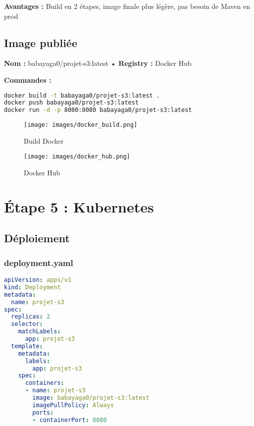 \documentclass[11pt,a4paper]{article}
\begin{document}
\textbf{Avantages :} Build en 2 étapes, image finale plus légère, pas besoin de Maven en prod

\subsection{Image publiée}
\begin{tcolorbox}[colback=blue!5!white,colframe=blue!75!black]
    \textbf{Nom :} babayaga0/projet-s3:latest • \textbf{Registry :} Docker Hub
\end{tcolorbox}

\textbf{Commandes :}
\begin{lstlisting}[language=bash]
docker build -t babayaga0/projet-s3:latest .
docker push babayaga0/projet-s3:latest
docker run -d -p 8080:8080 babayaga0/projet-s3:latest
\end{lstlisting}

\begin{figure}[H]
    \centering
    \texttt{[image: images/docker\_build.png]}
    \caption{Build Docker}
\end{figure}

\begin{figure}[H]
    \centering
    \texttt{[image: images/docker\_hub.png]}
    \caption{Docker Hub}
\end{figure}

\newpage

\section{Étape 5 : Kubernetes}

\subsection{Déploiement}

\subsubsection{deployment.yaml}
\begin{lstlisting}[language=yaml]
apiVersion: apps/v1
kind: Deployment
metadata:
  name: projet-s3
spec:
  replicas: 2
  selector:
    matchLabels:
      app: projet-s3
  template:
    metadata:
      labels:
        app: projet-s3
    spec:
      containers:
      - name: projet-s3
        image: babayaga0/projet-s3:latest
        imagePullPolicy: Always
        ports:
        - containerPort: 8080
\end{lstlisting}
\end{document}
